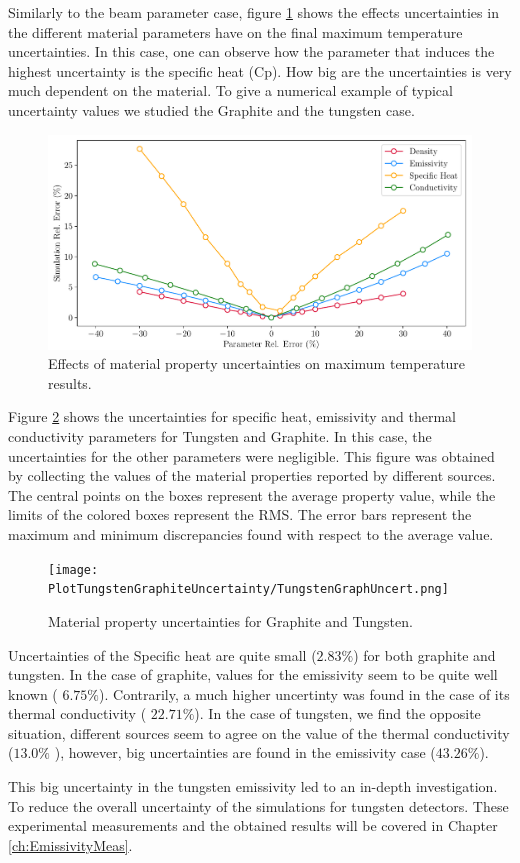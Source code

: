 Similarly to the beam parameter case, figure  \ref{fig:MatPar} shows the effects uncertainties in the different material parameters have on the final maximum temperature uncertainties. In this case, one can observe how the parameter that induces the highest uncertainty is the specific heat (Cp). How big are the uncertainties is very much dependent on the material. To give a numerical example of typical uncertainty values we studied the Graphite and the tungsten case. 

\begin{figure}[h]
    \centering
    \includegraphics[width=0.7\columnwidth]{MaterialParameterUncertainty/MatParUnc.pdf}
    \caption{Effects of material property uncertainties on maximum temperature results.}
    \label{fig:MatPar}
\end{figure}

Figure \ref{fig:MatPropUnc} shows the uncertainties for specific heat, emissivity and thermal conductivity
parameters for Tungsten and Graphite. In this case, the uncertainties for the other parameters were negligible. This figure was obtained by collecting the values of the material properties reported by different sources. The central points on the boxes represent the average property value, while the limits of the colored boxes represent the RMS. The error bars represent the maximum and minimum discrepancies found with respect to the average value. 

\begin{figure}[h]
    \centering
    \texttt{[image: PlotTungstenGraphiteUncertainty/TungstenGraphUncert.png]}
    \caption{Material property uncertainties for Graphite and Tungsten. }
    \label{fig:MatPropUnc}
\end{figure}

Uncertainties of the Specific heat are quite small ($2.83 \% $) for both graphite and tungsten. In the case of graphite, values for the emissivity seem to be quite well known ( $ 6.75\%$). Contrarily, a much higher uncertinty was found in the case of its thermal conductivity ( $ 22.71\%$). In the case of tungsten, we find the opposite situation, different sources seem to agree on the value of the thermal conductivity ($13.0\%$ ), however, big uncertainties are found in the emissivity case ($43.26 \%$). 

This big uncertainty in the tungsten emissivity led to an in-depth investigation. To reduce the overall uncertainty of the simulations for tungsten detectors. These experimental measurements and the obtained results will be covered in Chapter \ref{ch:EmissivityMeas}.